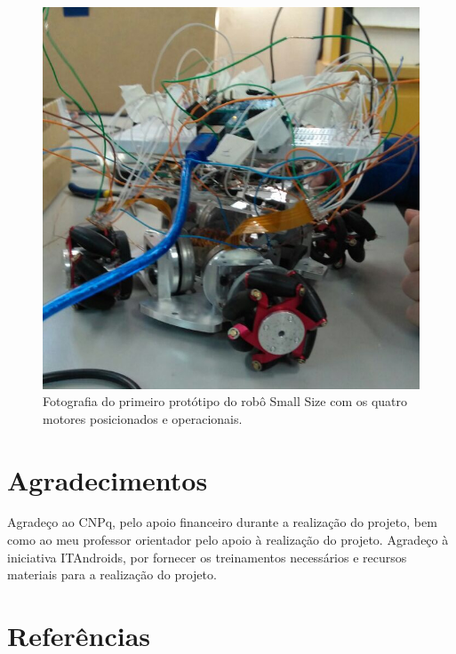 \documentclass[10pt,fleqn,a4paper]{article}
\begin{document}
	\begin{figure}[ht]
		\begin{center}
			\includegraphics[angle=0, scale=0.3]{images/smallfoto}
		\end{center}
		\caption{Fotografia do primeiro protótipo do robô Small Size com os quatro motores posicionados e operacionais.}
		\label{fig:smallfoto}
	\end{figure}

	\section{Agradecimentos}
	
	Agradeço ao CNPq, pelo apoio financeiro durante a realização do projeto, bem como ao meu professor orientador pelo apoio à realização do projeto. Agradeço à iniciativa ITAndroids, por fornecer os treinamentos necessários e recursos materiais para a realização do projeto.
	
	\section{Referências}
	\nocite{Matlab}
	
	
	
    
\end{document}
